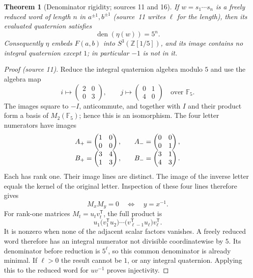 \documentclass[11pt,letterpaper]{article}
\numberwithin{equation}{section}
\newtheorem{theorem}{Theorem}[section]
\theoremstyle{definition}
\theoremstyle{remark}
\newcommand{\Z}{\mathbb Z}
\newcommand{\F}{\mathbb F}
\newcommand{\Sphere}{S^3}
\newcommand{\den}{\operatorname{den}}
\begin{document}
\begin{theorem}[Denominator rigidity; sources 11 and 16]
\label{pqc:rr:thm:denominator}\label{pqc:dr:thm:denominator}
If $w=s_1\cdots s_n$ is a freely reduced word of length $n$ in
$a^{\pm1},b^{\pm1}$ (source~11 writes $\ell$ for the length), then its
evaluated quaternion satisfies
\begin{equation}
 \den(\eta(w))=5^n.
 \label{pqc:dr:eq:exactden}
\end{equation}
Consequently $\eta$ embeds $F(a,b)$ into $\Sphere(\Z[1/5])$, and its image
contains no integral quaternion except $1$; in particular $-1$ is not in it.
\end{theorem}
\begin{proof}[Proof (source 11)]
Reduce the integral quaternion algebra modulo $5$ and use the algebra map
\[
 i\longmapsto\begin{pmatrix}2&0\\0&3\end{pmatrix},\qquad
 j\longmapsto\begin{pmatrix}0&1\\4&0\end{pmatrix}
 \quad\text{over }\F_5.
\]
The images square to $-I$, anticommute, and together with $I$ and their
product form a basis of $M_2(\F_5)$; hence this is an isomorphism.
The four letter numerators have images
\begin{equation}\label{pqc:rr:eq:mod5matrices}
\begin{array}{c@{\qquad}c}
 A_+=\begin{pmatrix}1&0\\0&0\end{pmatrix},&
 A_-=\begin{pmatrix}0&0\\0&1\end{pmatrix},\\[6pt]
 B_+=\begin{pmatrix}3&4\\1&3\end{pmatrix},&
 B_-=\begin{pmatrix}3&1\\4&3\end{pmatrix}.
\end{array}
\end{equation}
Each has rank one. Their image lines are distinct. The image of the
inverse letter equals the kernel of the original letter. Inspection of
these four lines therefore gives
\[
 M_xM_y=0\quad\Longleftrightarrow\quad y=x^{-1}.
\]
For rank-one matrices $M_t=u_tv_t^{\mathsf T}$, the full product is
\[
 u_1\bigl(v_1^{\mathsf T}u_2\bigr)\cdots
 \bigl(v_{\ell-1}^{\mathsf T}u_\ell\bigr)v_\ell^{\mathsf T}.
\]
It is nonzero when none of the adjacent scalar factors vanishes. A
freely reduced word therefore has an integral numerator not divisible
coordinatewise by $5$. Its denominator before reduction is $5^\ell$,
so this common denominator is already minimal. If $\ell>0$ the result
cannot be $1$, or any integral quaternion. Applying this to the reduced
word for $uv^{-1}$ proves injectivity.
\end{proof}
\end{document}
